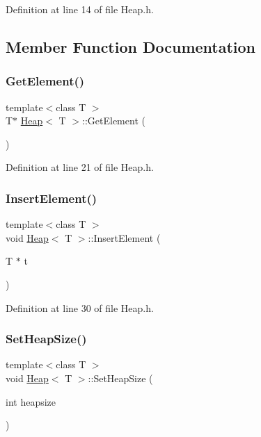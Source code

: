 Definition at line 14 of file Heap.\+h.



\subsection{Member Function Documentation}
\mbox{\label{class_heap_ad3a597474f313c4b8a3d26f8f687afa2}} 
\subsubsection{\texorpdfstring{Get\+Element()}{GetElement()}}
{\footnotesize\ttfamily template$<$class T $>$ \\
T$\ast$ \hyperlink{class_heap}{Heap}$<$ T $>$\+::Get\+Element (\begin{DoxyParamCaption}{ }\end{DoxyParamCaption})\hspace{0.3cm}{\ttfamily [inline]}}



Definition at line 21 of file Heap.\+h.

\mbox{\label{class_heap_aad789e01b5acbbebe0cceb62cf824832}} 
\subsubsection{\texorpdfstring{Insert\+Element()}{InsertElement()}}
{\footnotesize\ttfamily template$<$class T $>$ \\
void \hyperlink{class_heap}{Heap}$<$ T $>$\+::Insert\+Element (\begin{DoxyParamCaption}\item[{T $\ast$}]{t }\end{DoxyParamCaption})\hspace{0.3cm}{\ttfamily [inline]}}



Definition at line 30 of file Heap.\+h.

\mbox{\label{class_heap_a3b6ee5e7df307ff66d7d489c946c1745}} 
\subsubsection{\texorpdfstring{Set\+Heap\+Size()}{SetHeapSize()}}
{\footnotesize\ttfamily template$<$class T $>$ \\
void \hyperlink{class_heap}{Heap}$<$ T $>$\+::Set\+Heap\+Size (\begin{DoxyParamCaption}\item[{int}]{heapsize }\end{DoxyParamCaption})\hspace{0.3cm}{\ttfamily [inline]}}



